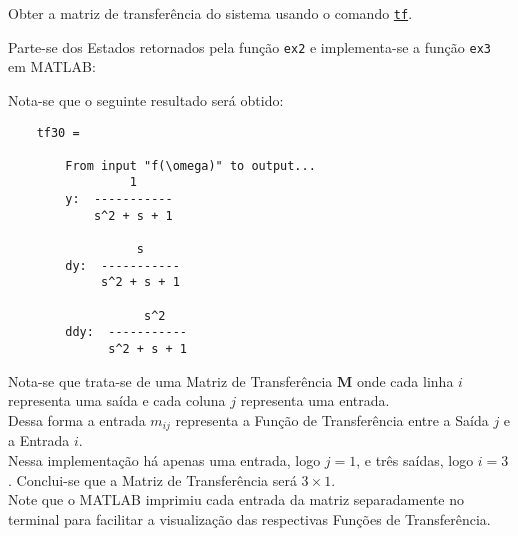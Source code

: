 \documentclass{article}
\begin{document}
\newpage\begin{exercise}\label{ex3}
    Obter a matriz de transferência do sistema usando o comando \href{https://www.mathworks.com/help/control/ref/tf.html}{\texttt{tf}}.
\end{exercise}
\begin{resolution}
    Parte-se dos Estados retornados pela função \texttt{ex2} e implementa-se a função \texttt{ex3} em MATLAB:
    \begin{scriptsize}
        \myMatlab
    \end{scriptsize}
    Nota-se que o seguinte resultado será obtido:
    \begin{scriptsize}
        \myMatlab\begin{lstlisting}
    tf30 =
 
        From input "f(\omega)" to output...
                 1
        y:  -----------
            s^2 + s + 1
        
                  s
        dy:  -----------
             s^2 + s + 1
        
                   s^2
        ddy:  -----------
              s^2 + s + 1
    \end{lstlisting}
    \end{scriptsize}
    Nota-se que trata-se de uma Matriz de Transferência $\mathbf{M}$ onde cada linha $i$ representa uma saída e cada coluna $j$ representa uma entrada.\\
    
    Dessa forma a entrada $m_{ij}$ representa a Função de Transferência entre a Saída $j$ e a Entrada $i$.\\

    Nessa implementação há apenas uma entrada, logo $j = 1$, e três saídas, logo $i = 3$. Conclui-se que a Matriz de Transferência será $3 \times 1$.\\

    Note que o MATLAB imprimiu cada entrada da matriz separadamente no terminal para facilitar a visualização das respectivas Funções de Transferência.
\end{resolution}
\end{document}
